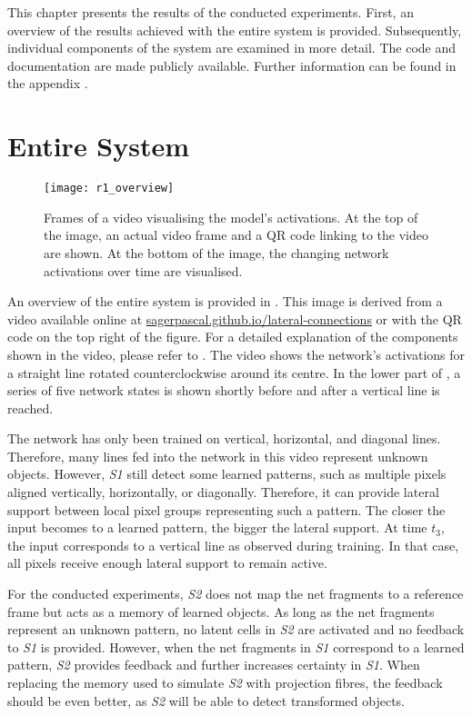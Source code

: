 This chapter presents the results of the conducted experiments. First, an overview of the results achieved with the entire system is provided. Subsequently, individual components of the system are examined in more detail.
The code and documentation are made publicly available. Further information can be found in the appendix .

\section{Entire System}
%
\begin{figure}[h]
    \centering
    \texttt{[image: r1\_overview]}
    \caption[Frames of a video visualising the model's activations]{Frames of a video visualising the model's activations. At the top of the image, an actual video frame and a QR code linking to the video are shown. At the bottom of the image, the changing network activations over time are visualised.}
\end{figure}
%
An overview of the entire system is provided in .
This image is derived from a video available online at \href{https://sagerpascal.github.io/lateral-connections/results/final_results.html#video-visualisations}{sagerpascal.github.io/lateral-connections} or with the QR code on the top right of the figure.
For a detailed explanation of the components shown in the video, please refer to .
The video shows the network's activations for a straight line rotated counterclockwise around its centre.
In the lower part of , a series of five network states is shown shortly before and after a vertical line is reached.

The network has only been trained on vertical, horizontal, and diagonal lines.
Therefore, many lines fed into the network in this video represent unknown objects.
However, \emph{S1} still detect some learned patterns, such as multiple pixels aligned vertically, horizontally, or diagonally.
Therefore, it can provide lateral support between local pixel groups representing such a pattern.
The closer the input becomes to a learned pattern, the bigger the lateral support.
At time $t_3$, the input corresponds to a vertical line as observed during training.
In that case, all pixels receive enough lateral support to remain active.

For the conducted experiments, \emph{S2} does not map the net fragments to a reference frame but acts as a memory of learned objects.
As long as the net fragments represent an unknown pattern, no latent cells in \emph{S2} are activated and no feedback to \emph{S1} is provided.
However, when the net fragments in \emph{S1} correspond to a learned pattern, \emph{S2} provides feedback and further increases certainty in \emph{S1}.
When replacing the memory used to simulate \emph{S2} with projection fibres, the feedback should be even better, as \emph{S2} will be able to detect transformed objects.

